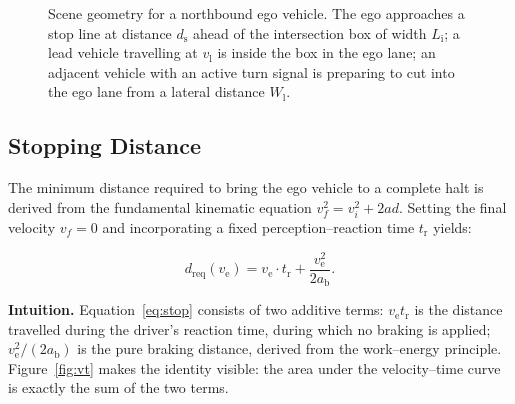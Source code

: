 \documentclass[conference, a4paper]{IEEEtran}
\theoremstyle{plain}
\newcommand{\dreq}{d_{\mathrm{req}}}
\newcommand{\ds}{d_{\mathrm{s}}}
\newcommand{\dl}{d_{\mathrm{l}}}
\newcommand{\tred}{t_{\mathrm{y}}}
\newcommand{\ab}{a_{\mathrm{b}}}
\newcommand{\tr}{t_{\mathrm{r}}}
\newcommand{\Li}{L_{\mathrm{i}}}
\newcommand{\Wl}{W_{\mathrm{l}}}
\newcommand{\ve}{v_{\mathrm{e}}}
\newcommand{\vl}{v_{\mathrm{l}}}
\begin{document}
\begin{figure}[t]
\caption{Scene geometry for a northbound ego vehicle. The ego approaches a
stop line at distance $\ds$ ahead of the intersection box of width $\Li$; a
lead vehicle travelling at $\vl$ is inside the box in the ego lane; an
adjacent vehicle with an active turn signal is preparing to cut into the ego
lane from a lateral distance $\Wl$.}
\label{fig:scenario}
\end{figure}

\subsection{Stopping Distance}
\label{subsec:stopping}

The minimum distance required to bring the ego vehicle to a complete halt is
derived from the fundamental kinematic equation $v_f^2 = v_i^2 + 2 a d$.
Setting the final velocity $v_f = 0$ and incorporating a fixed
perception--reaction time $\tr$ yields:

\begin{equation}
\dreq(\ve) = \ve \cdot \tr + \frac{\ve^2}{2 \ab}.
\label{eq:stop}
\end{equation}

\textbf{Intuition.} Equation~\eqref{eq:stop} consists of two additive terms:
$\ve \tr$ is the distance travelled during the driver's reaction time, during
which no braking is applied; $\ve^2/(2\ab)$ is the pure braking distance,
derived from the work--energy principle. Figure~\ref{fig:vt} makes the
identity visible: the area under the velocity--time curve is exactly the
sum of the two terms.
\end{document}
